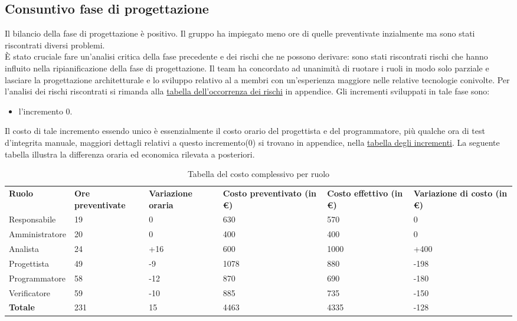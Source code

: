 \subsection{Consuntivo fase di progettazione}
Il bilancio della fase di progettazione è positivo. Il gruppo ha impiegato meno ore di quelle preventivate inzialmente ma sono stati riscontrati diversi problemi.\\
È stato cruciale fare un'analisi critica della fase precedente e dei rischi che ne possono derivare: sono stati riscontrati rischi che hanno influito nella ripianificazione della fase di progettazione.
Il team ha concordato ad unanimità di ruotare i ruoli in modo solo parziale e lasciare la progettazione architetturale e lo sviluppo relativo al  a membri con un'esperienza maggiore nelle relative tecnologie conivolte.
Per l'analisi dei rischi riscontrati si rimanda alla \hypersetup{
    linkcolor=blue
} \hyperlink{Tabellaoccorrenzarischi}{tabella dell'occorrenza dei rischi} 
\hypersetup{
    linkcolor=black
}
in appendice.
Gli incrementi sviluppati in tale fase sono:\\
\begin{itemize}
	\item l'incremento 0. 
\end{itemize}
Il costo di tale incremento essendo unico è essenzialmente il costo orario del progettista e del programmatore, più qualche ora di test d'integrita manuale, maggiori dettagli relativi a questo incremento(0) si trovano in appendice, nella 
\hypersetup{
    linkcolor=blue
}
\hyperlink{TabellaIncrementi}{tabella degli incrementi}.\hypersetup{
    linkcolor=black
}
La seguente tabella illustra la differenza oraria ed economica rilevata a posteriori.
{
\renewcommand{\arraystretch}{2}
\begin{longtable}[h]{ C{2.5cm} C{2cm} C{1.8cm} C{2.2cm} C{1.5cm} C{2.3cm}}
\caption{Tabella del costo complessivo per ruolo}\\
\rowcolor{\primaryColor}

\textcolor{\secondaryColor}{\textbf{Ruolo}} & 
\textcolor{\secondaryColor}{\textbf{Ore preventivate}} & 
\textcolor{\secondaryColor}{\textbf{Variazione oraria}} & 
\textcolor{\secondaryColor}{\textbf{Costo preventivato (in \euro{})}} & 
\textcolor{\secondaryColor}{\textbf{Costo effettivo (in \euro{})}} & 
\textcolor{\secondaryColor}{\textbf{Variazione di costo (in \euro{})}}\\	
	
Responsabile    &  19 & 0 & 630 & 570 &  0 \\
Amministratore  &  20 & 0 & 400 & 400 & 0 \\
Analista        & 24 & +16 & 600 & 1000 & +400 \\
Progettista     &  49 & -9 & 1078 & 880 & -198 \\
Programmatore   &   58 & -12 & 870 &  690 & -180 \\
Verificatore    &  59 &  -10 & 885 & 735 & -150 \\
\textbf{Totale} & 231 & 15 & 4463 & 4335 & -128 \\	
\end{longtable}
}


